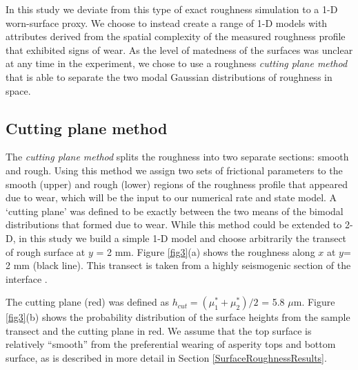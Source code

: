 \documentclass[final,3p, 11pt,authoryear]{elsarticle}
\begin{document}
In this study we deviate from this type of exact roughness simulation to a 1-D worn-surface proxy. We choose to instead create a range of 1-D models with attributes derived from the spatial complexity of the measured roughness profile that exhibited signs of wear.  As the level of matedness of the surfaces was unclear at any time in the experiment, we chose to use a roughness \textit{cutting plane method} that is able to separate the two modal Gaussian distributions of roughness in space.

\subsection{Cutting plane method}

The \textit{cutting plane method} splits the roughness into two separate sections: smooth and rough. Using this method we assign two sets of frictional parameters to the smooth (upper) and rough (lower) regions of the roughness profile that appeared due to wear, which will be the input to our numerical rate and state model. A `cutting plane' was defined to be exactly between the two means of the bimodal distributions that formed due to wear. While this method could be extended to 2-D, in this study we build a simple 1-D model and choose arbitrarily the transect of rough surface at $y$ = 2 mm. Figure \ref{fig3}(a) shows the roughness along $x$ at $y$= 2 mm (black line).  This transect is taken from a highly seismogenic section of the interface \citep{Selvadurai2015}. 

The cutting plane (red) was defined as $h_{cut} = \left(\mu^{*}_{1}+\mu^{*}_{2} \right)/2$ = 5.8 $\mu$m.  Figure \ref{fig3}(b) shows the probability distribution of the surface heights from the sample transect and the cutting plane in red. We assume that the top surface is relatively ``smooth'' from the preferential wearing of asperity tops and bottom surface, as is described in more detail in Section \ref{SurfaceRoughnessResults}.
\end{document}
